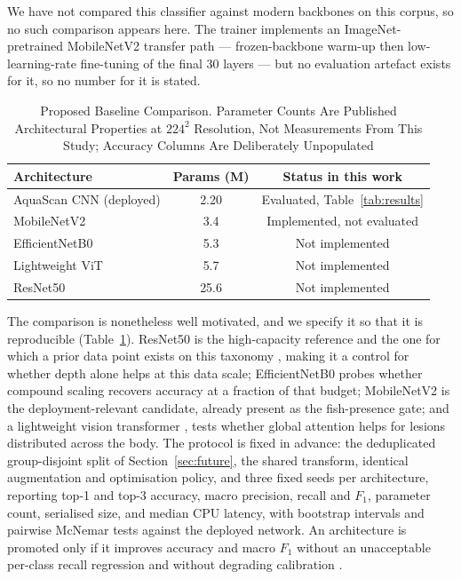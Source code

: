 \documentclass[conference]{IEEEtran}
\begin{document}
We have not compared this classifier against modern backbones on this corpus, so no such comparison appears here. The trainer implements an ImageNet-pretrained \cite{b26} MobileNetV2 \cite{b7} transfer path --- frozen-backbone warm-up then low-learning-rate fine-tuning of the final 30 layers --- but no evaluation artefact exists for it, so no number for it is stated.

\begin{table}[!t]
\caption{Proposed Baseline Comparison. Parameter Counts Are Published
Architectural Properties at $224^2$ Resolution, Not Measurements From This
Study; Accuracy Columns Are Deliberately Unpopulated}
\label{tab:baselines}
\centering
\scriptsize
\setlength{\tabcolsep}{5pt}
\begin{tabular}{lcc}
\toprule
\textbf{Architecture} & \textbf{Params (M)} & \textbf{Status in this work}\\
\midrule
AquaScan CNN (deployed) \cite{b1} & 2.20 & Evaluated, Table~\ref{tab:results}\\
MobileNetV2 \cite{b7} & 3.4 & Implemented, not evaluated\\
EfficientNetB0 \cite{b9} & 5.3 & Not implemented\\
Lightweight ViT \cite{b10} & 5.7 & Not implemented\\
ResNet50 \cite{b8} & 25.6 & Not implemented\\
\bottomrule
\end{tabular}
\end{table}

The comparison is nonetheless well motivated, and we specify it so that it is reproducible (Table~\ref{tab:baselines}). ResNet50 \cite{b8} is the high-capacity reference and the one for which a prior data point exists on this taxonomy \cite{b1}, making it a control for whether depth alone helps at this data scale; EfficientNetB0 \cite{b9} probes whether compound scaling recovers accuracy at a fraction of that budget; MobileNetV2 \cite{b7} is the deployment-relevant candidate, already present as the fish-presence gate; and a lightweight vision transformer \cite{b10}, \cite{b43} tests whether global attention helps for lesions distributed across the body. The protocol is fixed in advance: the deduplicated group-disjoint split of Section~\ref{sec:future}, the shared transform, identical augmentation and optimisation policy, and three fixed seeds per architecture, reporting top-1 and top-3 accuracy, macro precision, recall and $F_1$, parameter count, serialised size, and median CPU latency, with bootstrap intervals and pairwise McNemar tests \cite{b16} against the deployed network. An architecture is promoted only if it improves accuracy and macro $F_1$ without an unacceptable per-class recall regression and without degrading calibration \cite{b23}.
\end{document}
